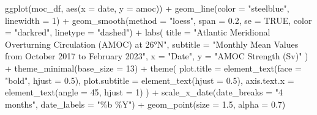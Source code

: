 \documentclass[
  11pt,
]{article}
\newenvironment{Shaded}{\begin{snugshade}}{\end{snugshade}}
\newcommand{\AttributeTok}[1]{\textcolor[rgb]{0.40,0.45,0.13}{#1}}
\newcommand{\ConstantTok}[1]{\textcolor[rgb]{0.56,0.35,0.01}{#1}}
\newcommand{\DecValTok}[1]{\textcolor[rgb]{0.68,0.00,0.00}{#1}}
\newcommand{\FloatTok}[1]{\textcolor[rgb]{0.68,0.00,0.00}{#1}}
\newcommand{\FunctionTok}[1]{\textcolor[rgb]{0.28,0.35,0.67}{#1}}
\newcommand{\NormalTok}[1]{\textcolor[rgb]{0.00,0.23,0.31}{#1}}
\newcommand{\SpecialCharTok}[1]{\textcolor[rgb]{0.37,0.37,0.37}{#1}}
\newcommand{\StringTok}[1]{\textcolor[rgb]{0.13,0.47,0.30}{#1}}
\begin{document}
\begin{Shaded}
\begin{Highlighting}[]
\FunctionTok{ggplot}\NormalTok{(moc\_df, }\FunctionTok{aes}\NormalTok{(}\AttributeTok{x =}\NormalTok{ date, }\AttributeTok{y =}\NormalTok{ amoc)) }\SpecialCharTok{+}
  \FunctionTok{geom\_line}\NormalTok{(}\AttributeTok{color =} \StringTok{"steelblue"}\NormalTok{, }\AttributeTok{linewidth =} \DecValTok{1}\NormalTok{) }\SpecialCharTok{+}
  \FunctionTok{geom\_smooth}\NormalTok{(}\AttributeTok{method =} \StringTok{"loess"}\NormalTok{, }\AttributeTok{span =} \FloatTok{0.2}\NormalTok{, }\AttributeTok{se =} \ConstantTok{TRUE}\NormalTok{, }\AttributeTok{color =} \StringTok{"darkred"}\NormalTok{, }\AttributeTok{linetype =} \StringTok{"dashed"}\NormalTok{) }\SpecialCharTok{+}
  \FunctionTok{labs}\NormalTok{(}
    \AttributeTok{title =} \StringTok{"Atlantic Meridional Overturning Circulation (AMOC) at 26°N"}\NormalTok{,}
    \AttributeTok{subtitle =} \StringTok{"Monthly Mean Values from October 2017 to February 2023"}\NormalTok{,}
    \AttributeTok{x =} \StringTok{"Date"}\NormalTok{,}
    \AttributeTok{y =} \StringTok{"AMOC Strength (Sv)"}
\NormalTok{  ) }\SpecialCharTok{+}
  \FunctionTok{theme\_minimal}\NormalTok{(}\AttributeTok{base\_size =} \DecValTok{13}\NormalTok{) }\SpecialCharTok{+}
  \FunctionTok{theme}\NormalTok{(}
    \AttributeTok{plot.title =} \FunctionTok{element\_text}\NormalTok{(}\AttributeTok{face =} \StringTok{"bold"}\NormalTok{, }\AttributeTok{hjust =} \FloatTok{0.5}\NormalTok{),}
    \AttributeTok{plot.subtitle =} \FunctionTok{element\_text}\NormalTok{(}\AttributeTok{hjust =} \FloatTok{0.5}\NormalTok{),}
    \AttributeTok{axis.text.x =} \FunctionTok{element\_text}\NormalTok{(}\AttributeTok{angle =} \DecValTok{45}\NormalTok{, }\AttributeTok{hjust =} \DecValTok{1}\NormalTok{)}
\NormalTok{  ) }\SpecialCharTok{+}
  \FunctionTok{scale\_x\_date}\NormalTok{(}\AttributeTok{date\_breaks =} \StringTok{"4 months"}\NormalTok{, }\AttributeTok{date\_labels =} \StringTok{"\%b \%Y"}\NormalTok{) }\SpecialCharTok{+}
  \FunctionTok{geom\_point}\NormalTok{(}\AttributeTok{size =} \FloatTok{1.5}\NormalTok{, }\AttributeTok{alpha =} \FloatTok{0.7}\NormalTok{)}
\end{Highlighting}
\end{Shaded}
\end{document}
